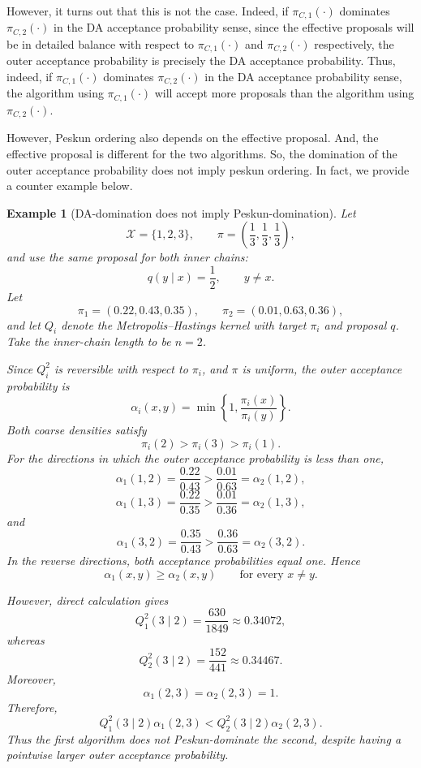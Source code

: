 \documentclass[12pt]{article}
\theoremstyle{definition}
\theoremstyle{remark}
\theoremstyle{plain}
\newtheorem{example}[theorem]{Example}
\begin{document}
However, it turns out that this is not the case. 
Indeed, if $\pi_{C,1}(\cdot)$ dominates $\pi_{C,2}(\cdot)$ in the DA acceptance probability sense, 
since the effective proposals will be in detailed balance with respect to $\pi_{C,1}(\cdot)$ and $\pi_{C,2}(\cdot)$ respectively, 
the outer acceptance probability is precisely the DA acceptance probability. 
Thus, indeed, if $\pi_{C,1}(\cdot)$ dominates $\pi_{C,2}(\cdot)$ in the DA acceptance probability sense, 
the algorithm using $\pi_{C,1}(\cdot)$ will accept more proposals than the algorithm using $\pi_{C,2}(\cdot)$.

However, Peskun ordering also depends on the effective proposal. 
And, the effective proposal is different for the two algorithms. 
So, the domination of the outer acceptance probability does not imply peskun ordering.
In fact, we provide a counter example below. 

\begin{example}[DA-domination does not imply Peskun-domination]
Let
\[
\mathcal X=\{1,2,3\},
\qquad
\pi=\left(\frac13,\frac13,\frac13\right),
\]
and use the same proposal for both inner chains:
\[
q(y\mid x)=\frac12,
\qquad y\neq x.
\]
Let
\[
\pi_1=(0.22,0.43,0.35),
\qquad
\pi_2=(0.01,0.63,0.36),
\]
and let \(Q_i\) denote the Metropolis--Hastings kernel with target
\(\pi_i\) and proposal \(q\). Take the inner-chain length to be \(n=2\).

Since \(Q_i^2\) is reversible with respect to \(\pi_i\), and \(\pi\) is
uniform, the outer acceptance probability is
\[
\alpha_i(x,y)
=
\min\left\{1,\frac{\pi_i(x)}{\pi_i(y)}\right\}.
\]
Both coarse densities satisfy
\[
\pi_i(2)>\pi_i(3)>\pi_i(1).
\]
For the directions in which the outer acceptance probability is less
than one,
\[
\alpha_1(1,2)
=
\frac{0.22}{0.43}
>
\frac{0.01}{0.63}
=
\alpha_2(1,2),
\]
\[
\alpha_1(1,3)
=
\frac{0.22}{0.35}
>
\frac{0.01}{0.36}
=
\alpha_2(1,3),
\]
and
\[
\alpha_1(3,2)
=
\frac{0.35}{0.43}
>
\frac{0.36}{0.63}
=
\alpha_2(3,2).
\]
In the reverse directions, both acceptance probabilities equal one.
Hence
\[
\alpha_1(x,y)\geq\alpha_2(x,y)
\qquad
\text{for every }x\neq y.
\]

However, direct calculation gives
\[
Q_1^2(3\mid2)
=
\frac{630}{1849}
\approx 0.34072,
\]
whereas
\[
Q_2^2(3\mid2)
=
\frac{152}{441}
\approx 0.34467.
\]
Moreover,
\[
\alpha_1(2,3)=\alpha_2(2,3)=1.
\]
Therefore,
\[
Q_1^2(3\mid2)\alpha_1(2,3)
<
Q_2^2(3\mid2)\alpha_2(2,3).
\]
Thus the first algorithm does not Peskun-dominate the second, despite
having a pointwise larger outer acceptance probability.
\end{example}
\end{document}
